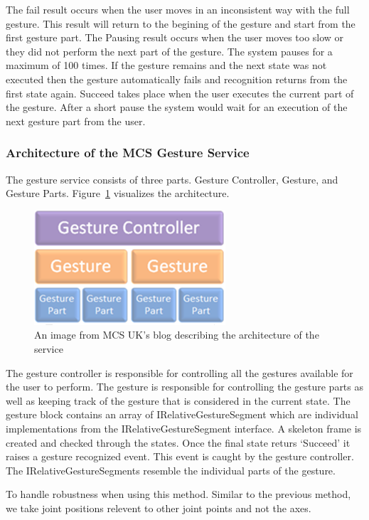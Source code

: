 The fail result occurs when the user moves in an inconsistent way with the full gesture. This result will return to the begining of the gesture and start from the first gesture part. The Pausing result occurs when the user moves too slow or they did not perform the next part of the gesture. The system pauses for a maximum of 100 times. If the gesture remains and the next state was not executed then the gesture automatically fails and recognition returns from the first state again. Succeed takes place when the user executes the current part of the gesture. After a short pause the system would wait for an execution of the next gesture part from the user.

\subsubsection{Architecture of the MCS Gesture Service}
The gesture service consists of three parts. Gesture Controller, Gesture, and Gesture Parts. Figure~\ref{gestureservicearc} visualizes the architecture.

\begin{figure}[!htbp]
\centering
\includegraphics{images/mcsarc.png}
\caption{An image from MCS UK's blog describing the architecture of the service}
\label{gestureservicearc}
\end{figure}

The gesture controller is responsible for controlling all the gestures available for the user to perform. The gesture is responsible for controlling the gesture parts as well as keeping track of the gesture that is considered in the current state. The gesture block contains an array of IRelativeGestureSegment which are individual implementations from the IRelativeGestureSegment interface. A skeleton frame is created and checked through the states. Once the final state returs `Succeed' it raises a gesture recognized event. This event is caught by the gesture controller. The IRelativeGestureSegments resemble the individual parts of the gesture.

To handle robustness when using this method. Similar to the previous method, we take joint positions relevent to other joint points and not the axes.
